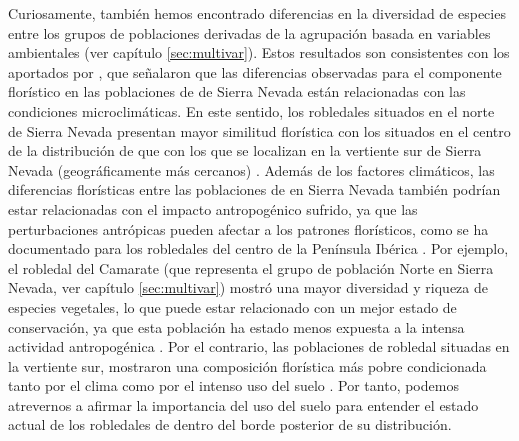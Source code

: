 Curiosamente, también hemos encontrado diferencias en la diversidad de especies entre los grupos de poblaciones derivadas de la agrupación basada en variables ambientales (ver capítulo \ref{sec:multivar}). Estos resultados son consistentes con los aportados por \textcite{Loriteetal2008PhytosociologicalReview}, que señalaron que las diferencias observadas para el componente florístico en las poblaciones de \Qp de Sierra Nevada están relacionadas con las condiciones microclimáticas. En este sentido, los robledales situados en el norte de Sierra Nevada presentan mayor similitud florística con los situados en el centro de la distribución de \Qp que con los que se localizan en la vertiente sur de Sierra Nevada (geográficamente más cercanos) \autocites{Loriteetal2008PhytosociologicalReview}. Además de los factores climáticos, las diferencias florísticas entre las poblaciones de \Qp en Sierra Nevada también podrían estar relacionadas con el impacto antropogénico sufrido, ya que las perturbaciones antrópicas pueden afectar a los patrones florísticos, como se ha documentado para los robledales del centro de la Península Ibérica \autocite{Gavilanetal2000EffectsDisturbance}. Por ejemplo, el robledal del Camarate (que representa el grupo de población Norte en Sierra Nevada, ver capítulo \ref{sec:multivar}) mostró una mayor diversidad y riqueza de especies vegetales, lo que puede estar relacionado con un mejor estado de conservación, ya que esta población ha estado menos expuesta a la intensa actividad antropogénica \autocite{JimenezOlivencia1991PaisajesSierra}. Por el contrario, las poblaciones de robledal situadas en la vertiente sur, mostraron una composición florística más pobre condicionada tanto por el clima como por el intenso uso del suelo \autocite{CamachoOlmedoetal2002DinamicaEvolutiva,AlAallalietal1998EstudioVegetacion}. Por tanto, podemos atrevernos a afirmar la importancia del uso del suelo para entender el estado actual de los robledales de \Qp dentro del borde posterior de su distribución. 

